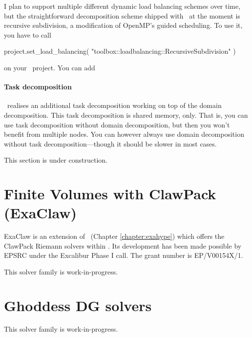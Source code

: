 I plan to support multiple different dynamic load balancing schemes over time,
but the straightforward decomposition scheme shipped with \Peano\ at the moment
is recursive subdivision, a modification of OpenMP's guided scheduling.
To use it, you have to call
\begin{code}
project.set_load_balancing( "toolbox::loadbalancing::RecursiveSubdivision" )
\end{code}

\noindent
on your \ExaHyPE\ project. You can add  


\paragraph{Task decomposition}
\ExaHyPE\ realises an additional task decomposition working on top of the domain
decomposition. 
This task decomposition is shared memory, only.
That is, you can use task decomposition without domain decomposition, but then
you won't benefit from multiple nodes.
You can however always use domain decomposition without task
decomposition---though it should be slower in most cases.

\begin{remark}
This section is under construction.
\end{remark} 





\section{Finite Volumes with ClawPack (ExaClaw)}

ExaClaw is an extension of \ExaHyPE\ (Chapter \ref{chapter:exahype}) which
offers the ClawPack Riemann solvers within \ExaHyPE.
Its development has been made possible by EPSRC under the Excalibur
Phase I call.
The grant number is EP/V00154X/1.


\begin{remark}
 This solver family is work-in-progress.
\end{remark}



\section{Ghoddess DG solvers}


\begin{remark}
 This solver family is work-in-progress.
\end{remark}



